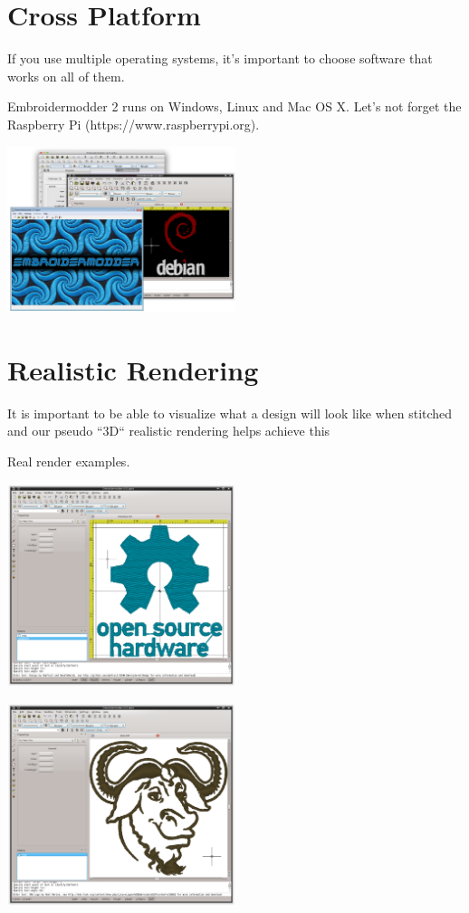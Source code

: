 \documentclass[11pt]{report}
\begin{document}
\section{Cross Platform}

If you use multiple operating systems, it's important to choose software that works on all of them.

Embroidermodder 2 runs on Windows, Linux and Mac OS X. Let's not forget the  Raspberry
Pi (https://www.raspberrypi.org).

\includegraphics[width=0.5\textwidth]{images/features-platforms-1.png}

\section{Realistic Rendering}

It is important to be able to visualize what a design will look like when stitched and our
pseudo ``3D`` realistic rendering helps achieve this

Real render examples.

\includegraphics[width=0.5\textwidth]{images/features-realrender-1.png}

\includegraphics[width=0.5\textwidth]{images/features-realrender-2.png}
\end{document}
